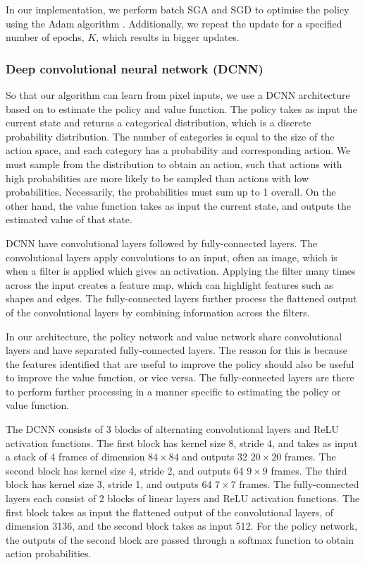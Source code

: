 \documentclass[12pt,a4paper]{article}
\begin{document}
In our implementation, we perform batch SGA and SGD to optimise the policy using the Adam algorithm \cite{kingma2017adam}. Additionally, we repeat the update for a specified number of epochs, $K$, which results in bigger updates.

\subsubsection{Deep convolutional neural network (DCNN)}
So that our algorithm can learn from pixel inputs, we use a DCNN architecture based on \cite{Mnih2015} to estimate the policy and value function. The policy takes as input the current state and returns a categorical distribution, which is a discrete probability distribution. The number of categories is equal to the size of the action space, and each category has a probability and corresponding action. We must sample from the distribution to obtain an action, such that actions with high probabilities are more likely to be sampled than actions with low probabilities. Necessarily, the probabilities must sum up to 1 overall. On the other hand, the value function takes as input the current state, and outputs the estimated value of that state. 

DCNN have convolutional layers followed by fully-connected layers. The convolutional layers apply convolutions to an input, often an image, which is when a filter is applied which gives an activation. Applying the filter many times across the input creates a feature map, which can highlight features such as shapes and edges. The fully-connected layers further process the flattened output of the convolutional layers by combining information across the filters.

In our architecture, the policy network and value network share convolutional layers and have separated fully-connected layers. The reason for this is because the features identified that are useful to improve the policy should also be useful to improve the value function, or vice versa. The fully-connected layers are there to perform further processing in a manner specific to estimating the policy or value function. 

The DCNN consists of 3 blocks of alternating convolutional layers and ReLU activation functions. The first block has kernel size 8, stride 4, and takes as input a stack of 4 frames of dimension $84 \times 84$ and outputs 32 $20 \times 20$ frames. The second block has kernel size 4, stride 2, and outputs 64 $9 \times 9$ frames. The third block has kernel size 3, stride 1, and outputs 64 $7 \times 7$ frames. The fully-connected layers each consist of 2 blocks of linear layers and ReLU activation functions. The first block takes as input the flattened output of the convolutional layers, of dimension 3136, and the second block takes as input 512. For the policy network, the outputs of the second block are passed through a softmax function to obtain action probabilities.
\end{document}
